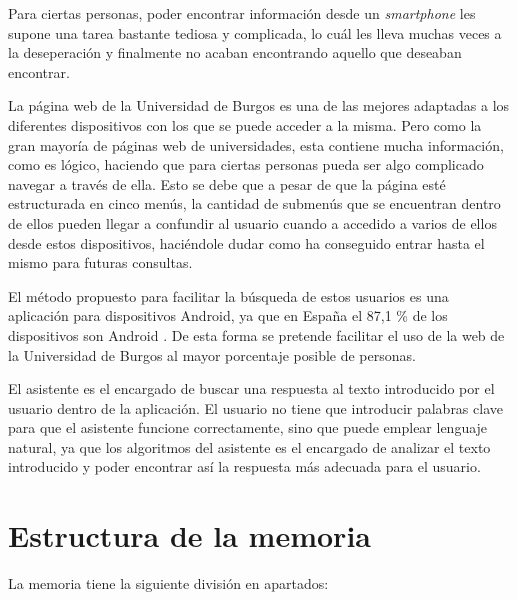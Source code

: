 
Para ciertas personas, poder encontrar información desde un \textit{smartphone} les supone una tarea bastante tediosa y complicada, lo cuál les lleva muchas veces a la deseperación y finalmente no acaban encontrando aquello que deseaban encontrar.

La página web de la Universidad de Burgos es una de las mejores adaptadas a los diferentes dispositivos con los que se puede acceder a la misma. Pero como la gran mayoría de páginas web de universidades, esta contiene mucha información, como es lógico, haciendo que para ciertas personas pueda ser algo complicado navegar a través de ella. Esto se debe que a pesar de que la página esté estructurada en cinco menús, la cantidad de submenús que se encuentran dentro de ellos pueden llegar a confundir al usuario cuando a accedido a varios de ellos desde estos dispositivos, haciéndole dudar como ha conseguido entrar hasta el mismo para futuras consultas.

El método propuesto para facilitar la búsqueda de estos usuarios es una aplicación para dispositivos Android, ya que en España el 87,1 \% de los dispositivos son Android \cite{android:data}. De esta forma se pretende facilitar el uso de la web de la Universidad de Burgos al mayor porcentaje posible de personas.

El asistente es el encargado de buscar una respuesta al texto introducido por el usuario dentro de la aplicación. El usuario no tiene que introducir palabras clave para que el asistente funcione correctamente, sino que puede emplear lenguaje natural, ya que los algoritmos del asistente es el encargado de analizar el texto introducido y poder encontrar así la respuesta más adecuada para el usuario.

\newpage

\section{Estructura de la memoria}\label{estructura-de-la-memoria}
La memoria tiene la siguiente división en apartados:

